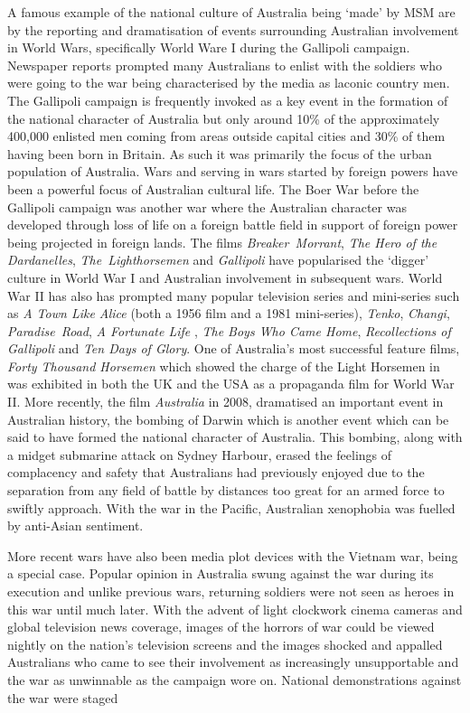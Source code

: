 A famous example of the national culture of Australia being `made' by MSM are by the reporting and dramatisation of events surrounding Australian involvement in World Wars, specifically World Ware I during the Gallipoli campaign. Newspaper reports prompted many Australians to enlist with the soldiers who were going to the war being characterised by the media as laconic country men. The Gallipoli campaign is frequently invoked as a key event in the formation of the national character of Australia but only around 10\% of the approximately 400,000 enlisted men coming from areas outside capital cities and 30\% of them having been born in Britain\cite{RefWorks:428}. As such it was primarily the focus of the urban population of Australia. Wars and serving in wars started by foreign powers have been a powerful focus of Australian cultural life. The Boer War before the Gallipoli campaign was another war where the Australian character was developed through loss of life on a foreign battle field in support of foreign power being projected in foreign lands. The films \emph{Breaker~Morrant}, \emph{The Hero of the Dardanelles}, \emph{The~Lighthorsemen} and \emph{Gallipoli} have popularised the `digger' culture in World War I and Australian involvement in subsequent wars. World War II has also has prompted many popular television series and mini-series such as \emph{A Town Like Alice} (both a 1956 film and a 1981 mini-series), \emph{Tenko}, \emph{Changi}, \emph{Paradise~Road}, \emph{A Fortunate Life} , \emph{The Boys Who Came Home}, \emph{Recollections of Gallipoli} and \emph{Ten Days of Glory}. One of Australia's most successful feature films, \emph{Forty Thousand Horsemen} which showed the charge of the Light Horsemen in was exhibited in both the UK and the USA as a propaganda film for World War II. More recently, the film \emph{Australia} in 2008, dramatised an important event in Australian history, the bombing of Darwin which is another event which can be said to have formed the national character of Australia. This bombing, along with a midget submarine attack on Sydney Harbour, erased the feelings of complacency and safety that Australians had previously enjoyed due to the separation from any field of battle by distances too great for an armed force to swiftly approach. With the war in the Pacific, Australian xenophobia was fuelled by anti-Asian sentiment.

More recent wars have also been media plot devices with the Vietnam war,  being a special case. Popular opinion in Australia swung against the war during its execution and unlike previous wars, returning soldiers were not seen as heroes in this war until much later. With the advent of light clockwork cinema cameras and global television news coverage, images of the horrors of war could be viewed nightly on the nation's television screens and the images shocked and appalled Australians who came to see their involvement as increasingly unsupportable and the war as unwinnable as the campaign wore on. National demonstrations against the war were staged


